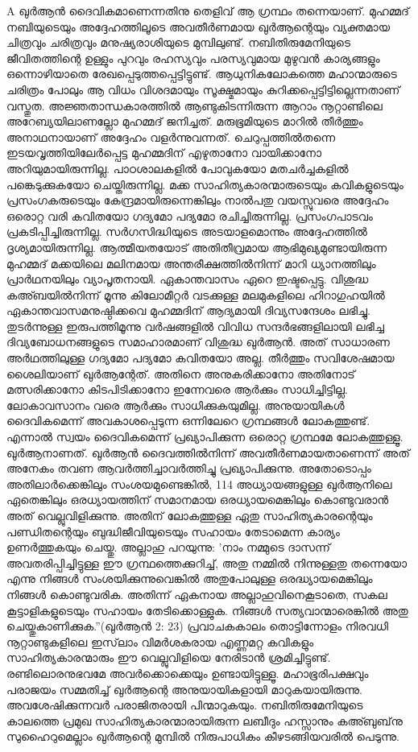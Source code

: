 A ഖുര്‍ആന്‍ ദൈവികമാണെന്നതിനു തെളിവ് ആ ഗ്രന്ഥം തന്നെയാണ്. മുഹമ്മദ് നബിയുടെയും അദ്ദേഹത്തിലൂടെ അവതീര്‍ണമായ ഖുര്‍ആന്റെയും വ്യക്തമായ ചിത്രവും ചരിത്രവും മനുഷ്യരാശിയുടെ മുമ്പിലുണ്ട്. നബിതിരുമേനിയുടെ ജീവിതത്തിന്റെ ഉള്ളും പുറവും രഹസ്യവും പരസ്യവുമായ മുഴുവന്‍ കാര്യങ്ങളും ഒന്നൊഴിയാതെ രേഖപ്പെടുത്തപ്പെട്ടിട്ടുണ്ട്. ആധുനികലോകത്തെ മഹാന്മാരുടെ ചരിത്രം പോലും ആ വിധം വിശദമായും സൂക്ഷ്മമായും കുറിക്കപ്പെട്ടിട്ടില്ലെന്നതാണ് വസ്തുത.
അജ്ഞതാന്ധകാരത്തില്‍ ആണ്ടുകിടന്നിരുന്ന ആറാം നൂറ്റാണ്ടിലെ അറേബ്യയിലാണല്ലോ മുഹമ്മദ് ജനിച്ചത്. മരുഭൂമിയുടെ മാറില്‍ തീര്‍ത്തും അനാഥനായാണ് അദ്ദേഹം വളര്‍ന്നുവന്നത്. ചെറുപ്പത്തില്‍തന്നെ ഇടയവൃത്തിയിലേര്‍പ്പെട്ട മുഹമ്മദിന് എഴുതാനോ വായിക്കാനോ അറിയുമായിരുന്നില്ല. പാഠശാലകളില്‍ പോവുകയോ മതചര്‍ച്ചകളില്‍ പങ്കെടുക്കുകയോ ചെയ്തിരുന്നില്ല. മക്ക സാഹിത്യകാരന്മാരുടെയും കവികളുടെയും പ്രസംഗകരുടെയും കേന്ദ്രമായിരുന്നെങ്കിലും നാല്‍പതു വയസ്സുവരെ അദ്ദേഹം ഒരൊറ്റ വരി കവിതയോ ഗദ്യമോ പദ്യമോ രചിച്ചിരുന്നില്ല. പ്രസംഗപാടവം പ്രകടിപ്പിച്ചിരുന്നില്ല. സര്‍ഗസിദ്ധിയുടെ അടയാളമൊന്നും അദ്ദേഹത്തില്‍ ദൃശ്യമായിരുന്നില്ല.
ആത്മീയതയോട് അതിതീവ്രമായ ആഭിമുഖ്യമുണ്ടായിരുന്ന മുഹമ്മദ് മക്കയിലെ മലിനമായ അന്തരീക്ഷത്തില്‍നിന്ന് മാറി ധ്യാനത്തിലും പ്രാര്‍ഥനയിലും വ്യാപൃതനായി. ഏകാന്തവാസം ഏറെ ഇഷ്ടപ്പെട്ടു. വിശുദ്ധ കഅ്ബയില്‍നിന്ന് മൂന്നു കിലോമീറ്റര്‍ വടക്കുള്ള മലമുകളിലെ ഹിറാഗുഹയില്‍ ഏകാന്തവാസമനുഷ്ഠിക്കവെ മുഹമ്മദിന് ആദ്യമായി ദിവ്യസന്ദേശം ലഭിച്ചു. തുടര്‍ന്നുള്ള ഇരുപത്തിമൂന്നു വര്‍ഷങ്ങളില്‍ വിവിധ സന്ദര്‍ഭങ്ങളിലായി ലഭിച്ച ദിവ്യബോധനങ്ങളുടെ സമാഹാരമാണ് വിശുദ്ധ ഖുര്‍ആന്‍. അത് സാധാരണ അര്‍ഥത്തിലുള്ള ഗദ്യമോ പദ്യമോ കവിതയോ അല്ല. തീര്‍ത്തും സവിശേഷമായ ശൈലിയാണ് ഖുര്‍ആന്റേത്. അതിനെ അനുകരിക്കാനോ അതിനോട് മത്സരിക്കാനോ കിടപിടിക്കാനോ ഇന്നേവരെ ആര്‍ക്കും സാധിച്ചിട്ടില്ല. ലോകാവസാനം വരെ ആര്‍ക്കും സാധിക്കുകയുമില്ല.
അനുയായികള്‍ ദൈവികമെന്ന് അവകാശപ്പെടുന്ന ഒന്നിലേറെ ഗ്രന്ഥങ്ങള്‍ ലോകത്തുണ്ട്. എന്നാല്‍ സ്വയം ദൈവികമെന്ന് പ്രഖ്യാപിക്കുന്ന ഒരൊറ്റ ഗ്രന്ഥമേ ലോകത്തുള്ളൂ. ഖുര്‍ആനാണത്. ഖുര്‍ആന്‍ ദൈവത്തില്‍നിന്ന് അവതീര്‍ണമായതാണെന്ന് അത് അനേകം തവണ ആവര്‍ത്തിച്ചാവര്‍ത്തിച്ചു പ്രഖ്യാപിക്കുന്നു. അതോടൊപ്പം അതിലാര്‍ക്കെങ്കിലും സംശയമുണ്ടെങ്കില്‍, 114 അധ്യായങ്ങളുള്ള ഖുര്‍ആനിലെ ഏതെങ്കിലും ഒരധ്യായത്തിന് സമാനമായ ഒരധ്യായമെങ്കിലും കൊണ്ടുവരാന്‍ അത് വെല്ലുവിളിക്കുന്നു. അതിന് ലോകത്തുള്ള ഏതു സാഹിത്യകാരന്റെയും പണ്ഡിതന്റെയും ബുദ്ധിജീവിയുടെയും സഹായം തേടാമെന്ന കാര്യം ഉണര്‍ത്തുകയും ചെയ്തു. അല്ലാഹു പറയുന്നു: 'നാം നമ്മുടെ ദാസന്ന് അവതരിപ്പിച്ചിട്ടുള്ള ഈ ഗ്രന്ഥത്തെക്കുറിച്ച്, അതു നമ്മില്‍ നിന്നുള്ളതു തന്നെയോ എന്നു നിങ്ങള്‍ സംശയിക്കുന്നുവെങ്കില്‍ അതുപോലുള്ള ഒരദ്ധ്യായമെങ്കിലും നിങ്ങള്‍ കൊണ്ടുവരിക. അതിന്ന് ഏകനായ അല്ലാഹുവിനെകൂടാതെ, സകല കൂട്ടാളികളുടെയും സഹായം തേടിക്കൊള്ളുക. നിങ്ങള്‍ സത്യവാന്മാരെങ്കില്‍ അതു ചെയ്തുകാണിക്കുക.''(ഖുര്‍ആന്‍ 2: 23)
പ്രവാചകകാലം തൊട്ടിന്നോളം നിരവധി നൂറ്റാണ്ടുകളിലെ ഇസ്‌ലാം വിമര്‍ശകരായ എണ്ണമറ്റ കവികളും സാഹിത്യകാരന്മാരും ഈ വെല്ലുവിളിയെ നേരിടാന്‍ ശ്രമിച്ചിട്ടുണ്ട്. രണ്ടിലൊരനുഭവമേ അവര്‍ക്കൊക്കെയും ഉണ്ടായിട്ടുള്ളൂ. മഹാഭൂരിപക്ഷവും പരാജയം സമ്മതിച്ച് ഖുര്‍ആന്റെ അനുയായികളായി മാറുകയായിരുന്നു. അവശേഷിക്കുന്നവര്‍ പരാജിതരായി പിന്മാറുകയും. നബിതിരുമേനിയുടെ കാലത്തെ പ്രമുഖ സാഹിത്യകാരന്മാരായിരുന്ന ലബീദും ഹസ്സാനും കഅ്ബുബ്‌നു സുഹൈറുമെല്ലാം ഖുര്‍ആന്റെ മുമ്പില്‍ നിരുപാധികം കീഴടങ്ങിയവരില്‍ പെടുന്നു.
